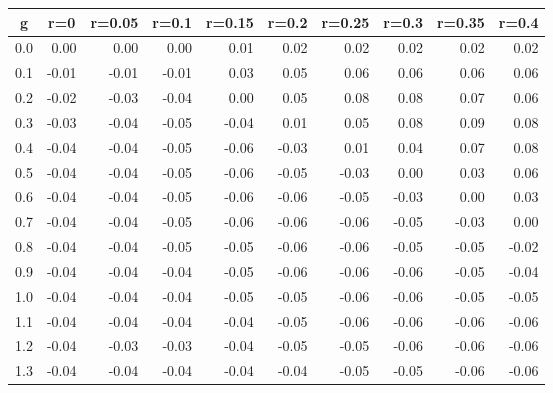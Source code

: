 %
\begin{table}[!tbp]
 \begin{center}
 \begin{tabular}{rrrrrrrrrr}\hline\hline
\multicolumn{1}{c}{g}&\multicolumn{1}{c}{r=0}&\multicolumn{1}{c}{r=0.05}&\multicolumn{1}{c}{r=0.1}&\multicolumn{1}{c}{r=0.15}&\multicolumn{1}{c}{r=0.2}&\multicolumn{1}{c}{r=0.25}&\multicolumn{1}{c}{r=0.3}&\multicolumn{1}{c}{r=0.35}&\multicolumn{1}{c}{r=0.4}\tabularnewline
\hline
0.0& 0.00& 0.00& 0.00& 0.01& 0.02& 0.02& 0.02& 0.02& 0.02\tabularnewline
0.1&-0.01&-0.01&-0.01& 0.03& 0.05& 0.06& 0.06& 0.06& 0.06\tabularnewline
0.2&-0.02&-0.03&-0.04& 0.00& 0.05& 0.08& 0.08& 0.07& 0.06\tabularnewline
0.3&-0.03&-0.04&-0.05&-0.04& 0.01& 0.05& 0.08& 0.09& 0.08\tabularnewline
0.4&-0.04&-0.04&-0.05&-0.06&-0.03& 0.01& 0.04& 0.07& 0.08\tabularnewline
0.5&-0.04&-0.04&-0.05&-0.06&-0.05&-0.03& 0.00& 0.03& 0.06\tabularnewline
0.6&-0.04&-0.04&-0.05&-0.06&-0.06&-0.05&-0.03& 0.00& 0.03\tabularnewline
0.7&-0.04&-0.04&-0.05&-0.06&-0.06&-0.06&-0.05&-0.03& 0.00\tabularnewline
0.8&-0.04&-0.04&-0.05&-0.05&-0.06&-0.06&-0.05&-0.05&-0.02\tabularnewline
0.9&-0.04&-0.04&-0.04&-0.05&-0.06&-0.06&-0.06&-0.05&-0.04\tabularnewline
1.0&-0.04&-0.04&-0.04&-0.05&-0.05&-0.06&-0.06&-0.05&-0.05\tabularnewline
1.1&-0.04&-0.04&-0.04&-0.04&-0.05&-0.06&-0.06&-0.06&-0.06\tabularnewline
1.2&-0.04&-0.03&-0.03&-0.04&-0.05&-0.05&-0.06&-0.06&-0.06\tabularnewline
1.3&-0.04&-0.04&-0.04&-0.04&-0.04&-0.05&-0.05&-0.06&-0.06\tabularnewline
\hline
\end{tabular}

\end{center}

\end{table}

